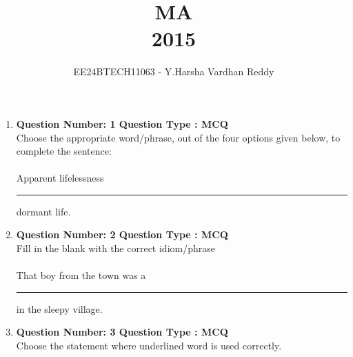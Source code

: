 \documentclass[journal,,12pt,onecolumn]{IEEEtran}
\theoremstyle{remark}
\begin{document}

\vspace{3cm}

\title{MA\\2015}
\author{EE24BTECH11063 - Y.Harsha Vardhan Reddy}
\maketitle

\bigskip

\renewcommand{\thefigure}{\theenumi}
\renewcommand{\thetable}{\theenumi}

\begin{enumerate}
\section*{Q.1 to Q.5 carry 1 mark each}
\item \textbf{Question Number: 1 Question Type : MCQ}\\
Choose the appropriate word/phrase, out of the four options given below, to complete the sentence:\\
\\
Apparent lifelessness \rule{1cm}{0.15mm} dormant life.
\begin{enumerate}
\end{enumerate}
\bigskip
\item \textbf{Question Number: 2 Question Type : MCQ}\\
Fill in the blank with the correct idiom/phrase\\
\\
That boy from the town was a \rule{1cm}{0.15mm} in the sleepy village.
\begin{enumerate}
\end{enumerate}
\bigskip
\item \textbf{Question Number: 3 Question Type : MCQ}\\
 Choose the statement where underlined word is used correctly. \\


\end{enumerate}
\end{document}
